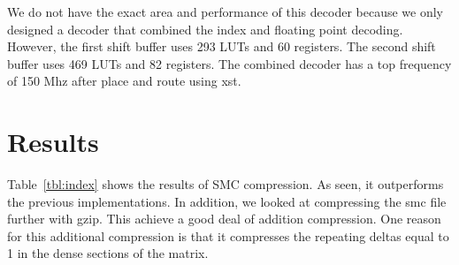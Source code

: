 We do not have the exact area and performance of this decoder because we only designed a decoder that combined the index and floating point decoding. However, the first shift buffer uses 293 LUTs and 60 registers. The second shift buffer uses 469 LUTs and 82 registers. The combined decoder has a top frequency of 150 Mhz after place and route using xst.

\section{Results}
\label{sec:smc_discussion}

Table~\ref{tbl:index}  shows the results of SMC compression. As seen, it outperforms the previous implementations. In addition, we looked at compressing the smc file further with gzip. This achieve a good deal of addition compression. One reason for this additional compression is that it compresses the repeating deltas equal to 1 in the dense sections of the matrix.
